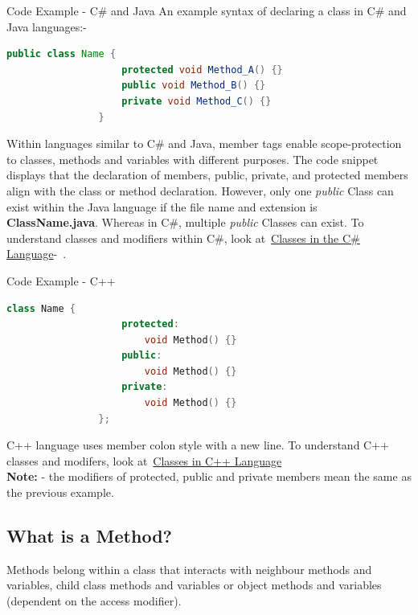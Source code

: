 \documentclass[10pt]{article}
\begin{document}
        \begin{example}{Code Example - C\# and Java}
            An example syntax of declaring a class in C\# and Java languages:-
            \begin{lstlisting}[language=java]
                public class Name { 
                    protected void Method_A() {}
                    public void Method_B() {}
                    private void Method_C() {}
                }
            \end{lstlisting}

            Within languages similar to C\# and Java, member tags enable scope-protection to classes, methods and variables with different purposes. The code snippet displays that the declaration of members, public, private, and protected members align with the class or method declaration. However, only one \textit{public} Class can exist within the Java language if the file name and extension is \textbf{ClassName.java}. Whereas in C\#, multiple \textit{public} Classes can exist. To understand classes and modifiers within C\#, look at~\href{https://docs.microsoft.com/en-us/dotnet/csharp/fundamentals/types/classes}{Classes in the C\# Language}-~\cite{bill_wagner_classes_2021}. 
        \end{example} 

        \begin{example}{Code Example - C++}
            \begin{lstlisting}[language=c++]
                class Name { 
                    protected:
                        void Method() {}
                    public:
                        void Method() {}
                    private: 
                        void Method() {}
                };
            \end{lstlisting}
            C++ language uses member colon style with a new line. To understand C++ classes and modifers, look at~\href{https://www.cplusplus.com/doc/tutorial/classes/}{Classes in C++ Language}~\cite{cpluspluscom_classes_nodate}\\
            \textbf{Note:} - the modifiers of protected, public and private members mean the same as the previous example.
        \end{example}

    \subsection{What is a Method?}
        Methods belong within a class that interacts with neighbour methods and variables, child class methods and variables or object methods and variables (dependent on the access modifier).
        
\end{document}
